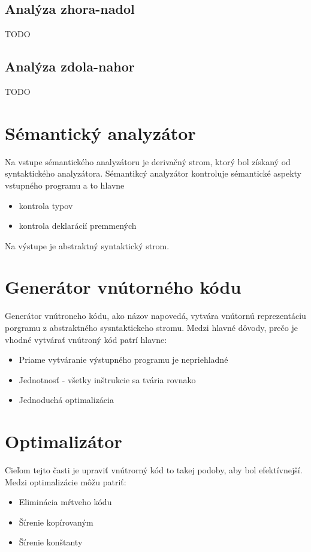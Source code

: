 \subsection{Analýza zhora-nadol}
TODO
\subsection{Analýza zdola-nahor}
TODO

\section{Sémantický analyzátor}
Na vstupe sémantického analyzátoru je derivačný strom, ktorý bol získaný od
syntaktického analyzátora. Sémantikcý analyzátor kontroluje sémantické aspekty
vstupného programu a to hlavne 
\begin{itemize}
    \item kontrola typov
    \item kontrola deklarácií premmených
\end{itemize}
Na výstupe je abstraktný syntaktický strom.

\section{Generátor vnútorného kódu}
Generátor vnútroneho kódu, ako názov napovedá, vytvára vnútornú reprezentáciu porgramu
z abstraktného sysntaktickeho stromu. Medzi hlavné dôvody, prečo je vhodné
vytvárať vnútroný kód patrí hlavne:
\begin{itemize}
    \item Priame vytváranie výstupného programu je nepriehladné
    \item Jednotnosť - všetky inštrukcie sa tvária rovnako
    \item Jednoduchá optimalizácia
\end{itemize}

\section{Optimalizátor}
Cieľom tejto časti je upraviť vnútrorný kód to takej podoby, aby bol efektívnejší.
Medzi optimalizácie môžu patriť:
\begin{itemize}
    \item Eliminácia mŕtveho kódu
    \item Šírenie kopírovaným
    \item Šírenie konštanty
\end{itemize}

